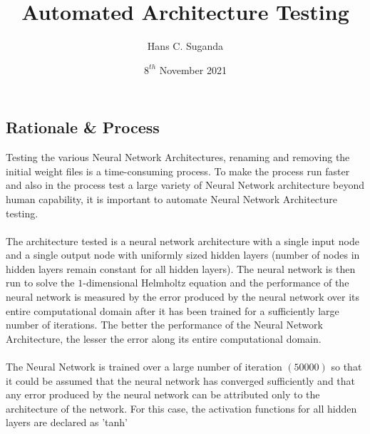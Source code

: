 \documentclass[a4paper, 12pt]{report}
\begin{document}
\title{Automated Architecture Testing}
\author{Hans C. Suganda}
\date{$8^{th}$ November 2021}
\maketitle
\newpage


\tableofcontents
\newpage

\begin{center}
\section{Rationale \& Process}
\begin{comment}

Name of Paper:
Brown University:



\end{comment}
Testing the various Neural Network Architectures, renaming and removing the initial weight files is a time-consuming process. To make the process run faster and also in the process test a large variety of Neural Network architecture beyond human capability, it is important to automate Neural Network Architecture testing. 
\\~\\The architecture tested is a neural network architecture with a single input node and a single output node with uniformly sized hidden layers (number of nodes in hidden layers remain constant for all hidden layers). The neural network is then run to solve the $1$-dimensional Helmholtz equation and the performance of the neural network is measured by the error produced by the neural network over its entire computational domain after it has been trained for a sufficiently large number of iterations. The better the performance of the Neural Network Architecture, the lesser the error along its entire computational domain.
\\~\\The Neural Network is trained over a large number of iteration $(50000)$ so that it could be assumed that the neural network has converged sufficiently and that any error produced by the neural network can be attributed only to the architecture of the network. For this case, the activation functions for all hidden layers are declared as 'tanh'

\end{center}
\end{document}
